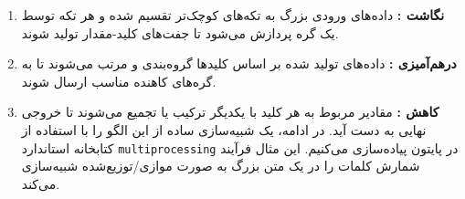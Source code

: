 \documentclass[12pt,a4paper,openany]{book}
\begin{document}
\begin{enumerate}
\item \textbf{نگاشت :} داده‌های ورودی بزرگ به تکه‌های کوچک‌تر تقسیم شده و هر تکه توسط یک گره پردازش می‌شود تا جفت‌های کلید-مقدار  تولید شوند.
\item \textbf{درهم‌آمیزی :} داده‌های تولید شده بر اساس کلیدها گروه‌بندی و مرتب می‌شوند تا به گره‌های کاهنده مناسب ارسال شوند.
\item \textbf{کاهش :} مقادیر مربوط به هر کلید با یکدیگر ترکیب یا تجمیع می‌شوند تا خروجی نهایی به دست آید.
در ادامه، یک شبیه‌سازی ساده از این الگو را با استفاده از کتابخانه استاندارد \texttt{multiprocessing} در پایتون پیاده‌سازی می‌کنیم. این مثال فرآیند شمارش کلمات  را در یک متن بزرگ به صورت موازی/توزیع‌شده شبیه‌سازی می‌کند.

\end{enumerate}
\end{document}

